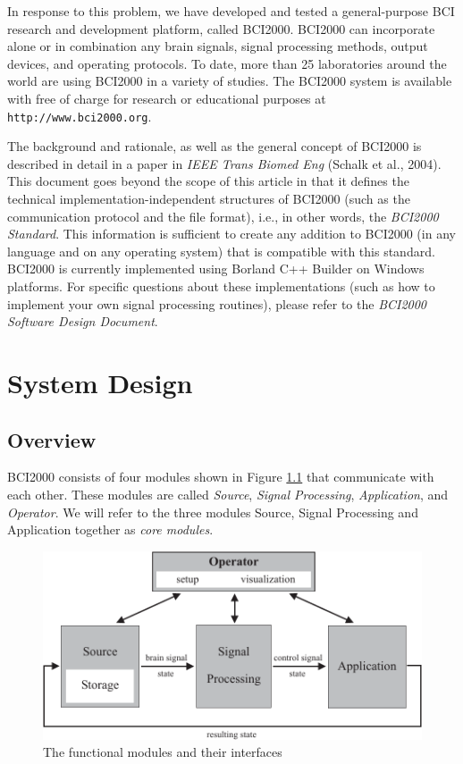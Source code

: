 \documentclass[letterpaper,oneside,12pt]{book}
\begin{document}
In response to this problem, we have developed and tested a general-purpose BCI 
research and development platform, called BCI2000. BCI2000 can incorporate alone 
or in combination any brain signals, signal processing methods, output devices, 
and operating protocols. To date, more than 25 laboratories around the world are 
using BCI2000 in a variety of studies. The BCI2000 system is available with 
free of charge for research or educational purposes at 
\texttt{http://www.bci2000.org}.

The background and rationale, as well as the general concept of BCI2000 is 
described in detail in a paper in \textit{IEEE Trans Biomed Eng} (Schalk et al., 
2004). This document goes beyond the scope of this article in that it defines 
the technical implementation-independent structures of BCI2000 (such as the 
communication protocol and the file format), i.e., in other words, the 
\emph{BCI2000 Standard}. This information is sufficient to create any addition 
to BCI2000 (in any language and on any operating system) that is compatible with 
this standard. BCI2000 is currently implemented using Borland C++ Builder on 
Windows platforms. For specific questions about these implementations 
(such as how to implement your own signal processing routines), please refer to 
the \emph{BCI2000 Software Design Document}.

\chapter{System Design} 

\section{Overview}

BCI2000 consists of four modules shown in Figure \ref{fig:modules} that 
communicate with each other. These modules are called \textit{Source}, 
\textit{Signal Processing}, \textit{Application}, and \textit{Operator}. We will 
refer to the three modules Source, Signal Processing and Application together as 
\textit{core modules}.


\begin{figure}[ht]
 \centerline{\includegraphics{figures/modules}}
 \caption{The functional modules and their interfaces}
 \label{fig:modules}
\end{figure}
\end{document}
